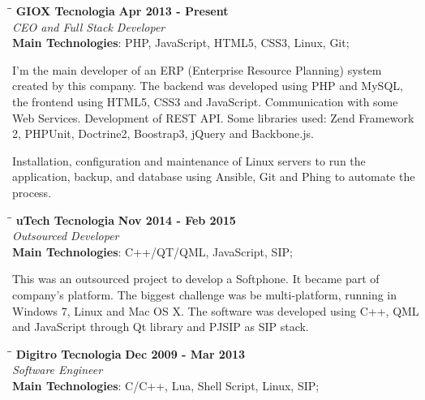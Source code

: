 \documentclass[margin]{res}
\begin{document}
\begin{resume}
\vspace{-0.1in}
   \begin{tabbing}
   \hspace{2.3in}\= \hspace{1.7in}\= \kill %
    \textbf{GIOX Tecnologia}    \>\>\textbf{Apr 2013 - Present}\\
    \textit{CEO and Full Stack Developer}\\        
    \textbf{Main Technologies}: PHP, JavaScript, HTML5, CSS3, Linux, Git;
   \end{tabbing}\vspace{-20pt}      %
    \vspace{2mm}
I'm the main developer of an ERP (Enterprise Resource Planning) system created by this company.
The backend was developed using PHP and MySQL, the frontend using HTML5, CSS3 and JavaScript. Communication with some Web 
Services. Development of REST API. Some libraries used: Zend Framework 2, PHPUnit, Doctrine2, Boostrap3, jQuery and Backbone.js.

Installation, configuration and maintenance of Linux servers to run the application, backup, and database using Ansible, Git and Phing to automate the process.
\vspace{-0.1in}
   \begin{tabbing}
   \hspace{2.3in}\= \hspace{1.7in}\= \kill %
    \textbf{uTech Tecnologia}    \>\>\textbf{Nov 2014 - Feb 2015}\\
    \textit{Outsourced Developer}\\        
    \textbf{Main Technologies}: C++/QT/QML, JavaScript, SIP;
   \end{tabbing}\vspace{-20pt}      %
    \vspace{2mm}
This was an outsourced project to develop a Softphone. It became part of company’s 
platform. The biggest challenge was be multi-platform, running in Windows 7, Linux and Mac OS X.
The software was developed using C++, QML and JavaScript through Qt library and PJSIP as SIP stack.

   \begin{tabbing}
   \hspace{2.3in}\= \hspace{1.7in}\= \kill %
    \textbf{Digitro Tecnologia}    \>\>\textbf{Dec 2009 - Mar 2013}\\
    \textit{Software Engineer}\\   
    \textbf{Main Technologies}: C/C++, Lua, Shell Script, Linux, SIP;
   \end{tabbing}\vspace{-20pt}      %
    \vspace{2mm}


\end{resume}
\end{document}

